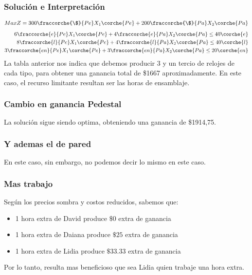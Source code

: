 \begin{homeworkProblem}

\subsubsection{Solución e Interpretación}
\begin{align*}
    Max Z = 300\fraccorche{\$}{Pe}X_1\corche{Pe} + 200\fraccorche{\$}{Pa}X_2\corche{Pa} \\
\end{align*}
\begin{align*}
    6\fraccorche{e}{Pe}X_1\corche{Pe} + 4\fraccorche{e}{Pa}X_2\corche{Pa} \le 40\corche{e} \\
    8\fraccorche{l}{Pe}X_1\corche{Pe} + 4\fraccorche{l}{Pa}X_2\corche{Pa} \le 40\corche{l} \\
    3\fraccorche{en}{Pe}X_1\corche{Pe} + 3\fraccorche{en}{Pa}X_2\corche{Pa} \le 20\corche{en} \\
\end{align*}
La tabla anterior nos indica que debemos producir 3 y un tercio de relojes de cada tipo, para obtener una ganancia total de \$1667 aproximadamente. En este caso, el recurso limitante resultan ser las horas de ensamblaje.

\subsubsection{Cambio en ganancia Pedestal}
La solución sigue siendo optima, obteniendo una ganancia de \$1914,75. \\
\subsubsection{Y ademas el de pared}
En este caso, sin embargo, no podemos decir lo mismo en este caso.
\subsubsection{Mas trabajo}
Según los precios sombra y costos reducidos, sabemos que:
\begin{itemize}
    \item 1 hora extra de David produce $\$0$ extra de ganancia
    \item 1 hora extra de Daiana produce $\$25$ extra de ganancia
    \item 1 hora extra de Lidia produce $\$33.33$ extra de ganancia
\end{itemize}
Por lo tanto, resulta mas beneficioso que sea Lidia quien trabaje una hora extra.


\end{homeworkProblem}
